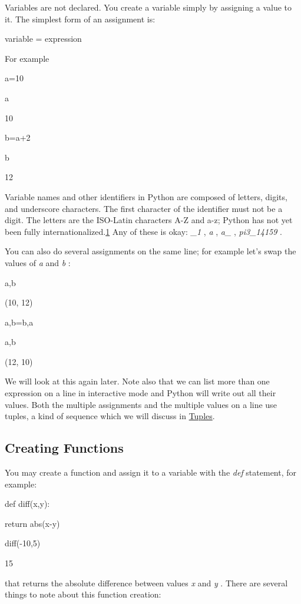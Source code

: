 Variables are not declared. You
create a variable simply by assigning a value to it. The simplest form
of an assignment is:

variable = expression

For example


a=10


a

10


b=a+2


b

12

Variable names and other
identifiers in Python are composed of letters, digits, and underscore
characters. The first character of the identifier must not be a digit.
The letters are the ISO-Latin characters A-Z and a-z; Python has not yet
been fully internationalized.\protect\hyperlink{pgfId-115789}{1} Any of
these is okay: \emph{\_1} , \emph{a} , \emph{a\_} , \emph{pi3\_14159} .

You can also do several assignments
on the same line; for example let's swap the values of \emph{a} and
\emph{b} :


a,b

(10, 12)


a,b=b,a


a,b

(12, 10)

We will look at this again later.
Note also that we can list more than one expression on a line in
interactive mode and Python will write out all their values. Both the
multiple assignments and the multiple values on a line use tuples, a
kind of sequence which we will discuss in
\href{chap2.html\#92836}{Tuples}.

\subsection{Creating Functions}
\label{creating-functions}

You may create a function and
assign it to a variable with the \emph{def} statement, for example:


def diff(x,y):

 return abs(x-y)




diff(-10,5)

15

 that
returns the absolute difference between values \emph{x} and \emph{y} .
There are several things to note about this function creation:

